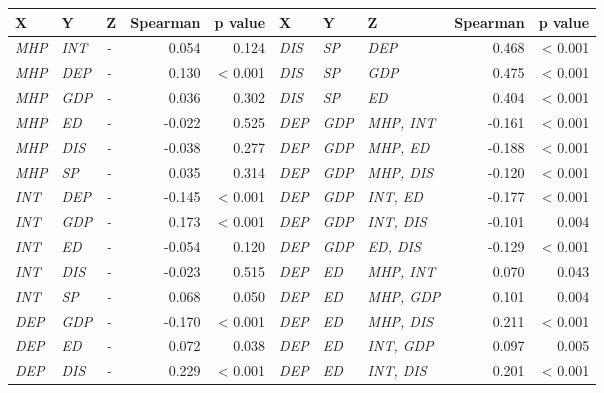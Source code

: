 \begin{tabular}{lllrr|lllrr}
\toprule
X & Y & Z & Spearman & p value & X & Y & Z & Spearman & p value \\
\midrule
\textit{MHP} & \textit{INT} & \textit{-} & 0.054 & 0.124 & \textit{DIS} & \textit{SP} & \textit{DEP} & 0.468 & \textless{} 0.001 \\
\textit{MHP} & \textit{DEP} & \textit{-} & 0.130 & \textless{} 0.001 & \textit{DIS} & \textit{SP} & \textit{GDP} & 0.475 & \textless{} 0.001 \\
\textit{MHP} & \textit{GDP} & \textit{-} & 0.036 & 0.302 & \textit{DIS} & \textit{SP} & \textit{ED} & 0.404 & \textless{} 0.001 \\
\textit{MHP} & \textit{ED} & \textit{-} & -0.022 & 0.525 & \textit{DEP} & \textit{GDP} & \textit{MHP, INT} & -0.161 & \textless{} 0.001 \\
\textit{MHP} & \textit{DIS} & \textit{-} & -0.038 & 0.277 & \textit{DEP} & \textit{GDP} & \textit{MHP, ED} & -0.188 & \textless{} 0.001 \\
\textit{MHP} & \textit{SP} & \textit{-} & 0.035 & 0.314 & \textit{DEP} & \textit{GDP} & \textit{MHP, DIS} & -0.120 & \textless{} 0.001 \\
\textit{INT} & \textit{DEP} & \textit{-} & -0.145 & \textless{} 0.001 & \textit{DEP} & \textit{GDP} & \textit{INT, ED} & -0.177 & \textless{} 0.001 \\
\textit{INT} & \textit{GDP} & \textit{-} & 0.173 & \textless{} 0.001 & \textit{DEP} & \textit{GDP} & \textit{INT, DIS} & -0.101 & 0.004 \\
\textit{INT} & \textit{ED} & \textit{-} & -0.054 & 0.120 & \textit{DEP} & \textit{GDP} & \textit{ED, DIS} & -0.129 & \textless{} 0.001 \\
\textit{INT} & \textit{DIS} & \textit{-} & -0.023 & 0.515 & \textit{DEP} & \textit{ED} & \textit{MHP, INT} & 0.070 & 0.043 \\
\textit{INT} & \textit{SP} & \textit{-} & 0.068 & 0.050 & \textit{DEP} & \textit{ED} & \textit{MHP, GDP} & 0.101 & 0.004 \\
\textit{DEP} & \textit{GDP} & \textit{-} & -0.170 & \textless{} 0.001 & \textit{DEP} & \textit{ED} & \textit{MHP, DIS} & 0.211 & \textless{} 0.001 \\
\textit{DEP} & \textit{ED} & \textit{-} & 0.072 & 0.038 & \textit{DEP} & \textit{ED} & \textit{INT, GDP} & 0.097 & 0.005 \\
\textit{DEP} & \textit{DIS} & \textit{-} & 0.229 & \textless{} 0.001 & \textit{DEP} & \textit{ED} & \textit{INT, DIS} & 0.201 & \textless{} 0.001 \\

\end{tabular}
